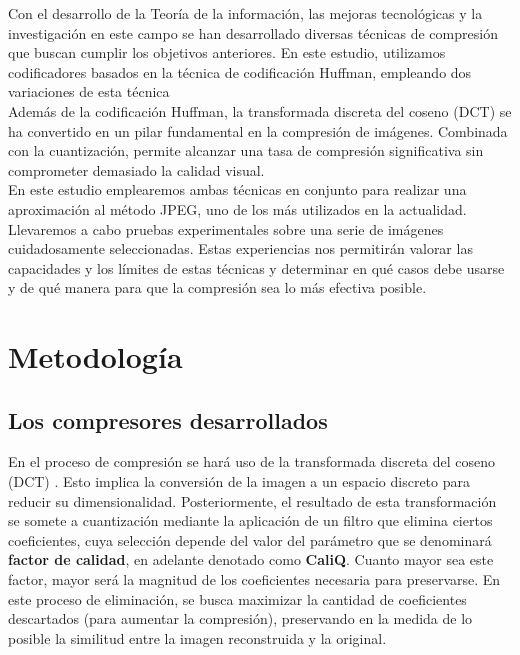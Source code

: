 \documentclass[12pt,a4paper]{article}
\begin{document}
Con el desarrollo de la Teoría de la información, las mejoras tecnológicas y la investigación en este campo se han desarrollado diversas técnicas de compresión que buscan cumplir los objetivos anteriores. En este estudio, utilizamos codificadores basados en la técnica de codificación Huffman, empleando dos variaciones de esta técnica \\

Además de la codificación Huffman, la transformada discreta del coseno (DCT) se ha convertido en un pilar fundamental en la compresión de imágenes. Combinada con la cuantización, permite alcanzar una tasa de compresión significativa sin comprometer demasiado la calidad visual.\\


En este estudio emplearemos ambas técnicas en conjunto para realizar una aproximación al método JPEG, uno de los más utilizados en la actualidad.\\

Llevaremos a cabo pruebas experimentales sobre una serie de imágenes cuidadosamente seleccionadas. Estas experiencias nos permitirán valorar las capacidades y los límites de estas técnicas y determinar en qué casos debe usarse y de qué manera para que la compresión sea lo más efectiva posible.


\newpage
\section{Metodología}
\subsection{Los compresores desarrollados}\label{metodologia}
En el proceso de compresión se hará uso de la transformada discreta del coseno (DCT) \cite{wiki-DCT}. Esto implica la conversión de la imagen a un espacio discreto para reducir su dimensionalidad. 
Posteriormente, el resultado de esta transformación se somete a cuantización mediante la aplicación de un filtro que elimina ciertos coeficientes, cuya selección depende del valor del parámetro que se denominará \textbf{factor de calidad}, en adelante denotado como \textbf{CaliQ}. Cuanto mayor sea este factor, mayor será la magnitud de los coeficientes necesaria para preservarse. En este proceso de eliminación, se busca maximizar la cantidad de coeficientes descartados (para aumentar la compresión), preservando en la medida de lo posible la similitud entre la imagen reconstruida y la original.\\
\end{document}
